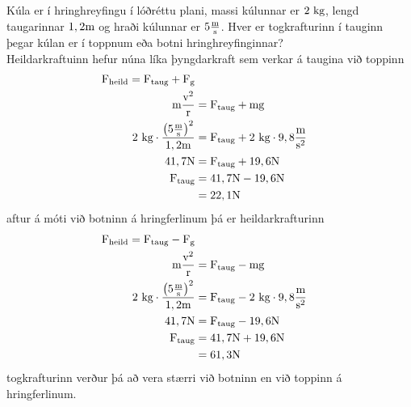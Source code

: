 \begin{formalexample}
Kúla er í hringhreyfingu í lóðréttu plani, massi kúlunnar er $2 \textrm{ k}\textrm{g}$,
lengd taugarinnar $1,2 \textrm{m}$ og hraði kúlunnar er $5 \frac{\textrm{m}}{\textrm{s}}$.
Hver er togkrafturinn í tauginn þegar kúlan er í toppnum eða botni hringhreyfinginnar?
\\[4 ex]
Heildarkraftuinn hefur núna líka þyngdarkraft sem verkar á taugina við toppinn
\begin{align*}
	\textrm{F}_\text{heild} 
		= \textrm{F}_\text{taug} + \textrm{F}_\text{g}\\
	\textrm{m} \frac{\textrm{v}^2}{\textrm{r}} &= 
		\textrm{F}_\text{taug} + \textrm{m} \textrm{g}\\
	2 \textrm{ k}\textrm{g} \cdot \frac{\left( 5 \frac{\textrm{m}}{\textrm{s}} \right)^2}{1,2 \textrm{m}} &= 
		\textrm{F}_\text{taug} + 2 \textrm{ k}\textrm{g} \cdot 9,8 \frac{\textrm{m}}{\textrm{s}^2}\\
	41,7 \textrm{N} &= 
		\textrm{F}_\text{taug} + 19,6 \textrm{N}\\
	\textrm{F}_\text{taug} &= 
		41,7 \textrm{N} - 19,6 \textrm{N}\\
	 &= 
		22,1 \textrm{N}
\end{align*}
aftur á móti við botninn á hringferlinum þá er heildarkrafturinn
\begin{align*}
	\textrm{F}_\text{heild} 
		= \textrm{F}_\text{taug} - \textrm{F}_\text{g}\\
	\textrm{m} \frac{\textrm{v}^2}{\textrm{r}} &= 
		\textrm{F}_\text{taug} - \textrm{m} \textrm{g}\\
	2 \textrm{ k}\textrm{g} \cdot \frac{\left( 5 \frac{\textrm{m}}{\textrm{s}} \right)^2}{1,2 \textrm{m}} &= 
		\textrm{F}_\text{taug} - 2 \textrm{ k}\textrm{g} \cdot 9,8 \frac{\textrm{m}}{\textrm{s}^2}\\
	41,7 \textrm{N} &= 
		\textrm{F}_\text{taug} - 19,6 \textrm{N}\\
	\textrm{F}_\text{taug} &= 
		41,7 \textrm{N} + 19,6 \textrm{N}\\
	 &= 
		61,3 \textrm{N}
\end{align*}
togkrafturinn verður þá að vera stærri við botninn en við toppinn á hringferlinum.
\end{formalexample}
